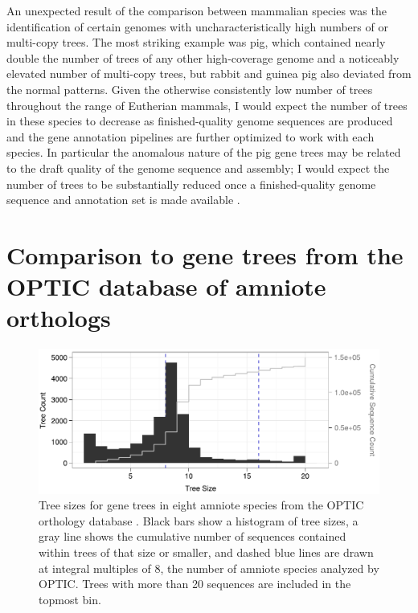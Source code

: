 An unexpected result of the comparison between mammalian species was
the identification of certain genomes with uncharacteristically high
numbers of \zcop or multi-copy trees. The most striking example was
pig, which contained nearly double the number of \zcop trees of any
other high-coverage \mammln genome and a noticeably elevated number of
multi-copy trees, but rabbit and guinea pig also deviated from the
normal patterns. Given the otherwise consistently low number of \zcop
trees throughout the range of Eutherian mammals, I would expect the
number of \zcop trees in these species to decrease as finished-quality
genome sequences are produced and the gene annotation pipelines are
further optimized to work with each species. In particular the
anomalous nature of the pig gene trees may be related to the draft
quality of the genome sequence and assembly; I would expect the number
of \zcop trees to be substantially reduced once a finished-quality
genome sequence and annotation set is made available
\citep{Archibald2010}.


\section{Comparison to gene trees from the OPTIC database of amniote orthologs}

\begin{figure}
\centering
\includegraphics[scale=0.9]{Figs/hist_optic_roots.pdf}
\caption{Tree sizes for gene trees in eight amniote species from
  the OPTIC orthology database \citep{Heger2008}. Black bars show a
  histogram of tree sizes, a gray line shows the cumulative
  number of sequences contained within trees of that size or
  smaller, and dashed blue lines are drawn at integral multiples of 8,
  the number of amniote species analyzed by OPTIC. Trees with more
  than 20 sequences are included in the topmost bin.}
\label{fig_optic_roots_hist}
\end{figure}

